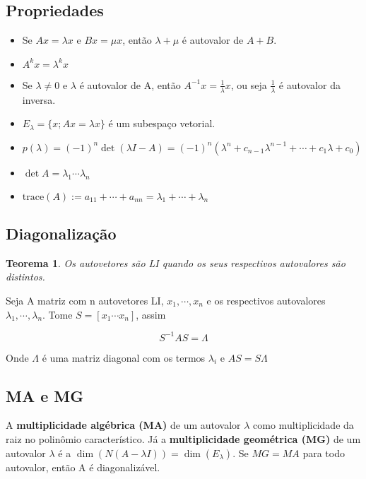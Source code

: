 \documentclass[12pt]{article}
\newtheorem{theorem}{Teorema}
\begin{document}
\subsection*{Propriedades}
\begin{itemize}
    \item Se $Ax = \lambda x$ e $Bx = \mu x$, então $\lambda + \mu$ é autovalor de $A + B$.
    
    \item $A^kx = \lambda^kx$
    
    \item Se $\lambda \neq 0$ e $\lambda$ é autovalor de A, então $A^{-1} x = \frac{1}{\lambda} x$, ou seja $\frac{1}{\lambda}$ é autovalor da inversa.
    
    \item $E_{\lambda} = \{ x; Ax = \lambda x \}$ é um subespaço vetorial.
    
    \item $p(\lambda) = (-1)^n \det (\lambda I - A) = (-1)^n (\lambda^n + c_{n-1}\lambda^{n-1} + \cdots + c_1 \lambda + c_0)$
    
    \item $\det A = \lambda_1 \cdots \lambda_n$
    
    \item $\text{trace} (A) := a_{11} + \cdots + a_{nn} = \lambda_1 + \cdots + \lambda_n$
\end{itemize}

\subsection*{Diagonalização}
\begin{theorem} Os autovetores são LI quando os seus respectivos autovalores são distintos.
\end{theorem}

Seja A matriz com n autovetores LI, {$x_1, \cdots, x_n$} e os respectivos autovalores {$\lambda_1, \cdots, \lambda_n$}. Tome $S = \left[ x_1 \cdots x_n \right]$, assim

$$S^{-1} A S = \Lambda$$

Onde $\Lambda$ é uma matriz diagonal com os termos $\lambda_i$ e $AS = S \Lambda$

\subsection*{MA e MG}
A \textbf{multiplicidade algébrica (MA)} de um autovalor $\lambda$ como multiplicidade da raiz no polinômio característico. Já a \textbf{multiplicidade geométrica (MG)} de um autovalor $\lambda$ é a $\dim(N(A - \lambda I)) = \dim(E_{\lambda})$. Se $MG = MA$ para todo autovalor, então A é diagonalizável.
\end{document}
